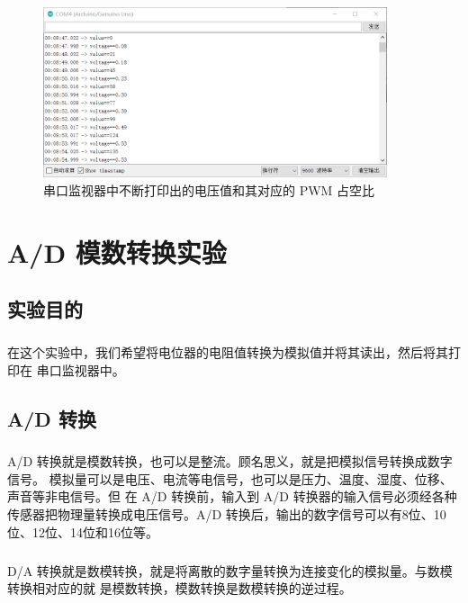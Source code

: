 \documentclass[UTF8, oneside]{ctexbook}
\begin{document}
\begin{figure}[h]
    \centering
    \includegraphics[width=0.9\textwidth]{./result/basic/7/result1.png}
    \caption{串口监视器中不断打印出的电压值和其对应的 PWM 占空比}
    \label{b7_2}
\end{figure}

\chapter{A/D 模数转换实验}

\section{实验目的}
\paragraph{}
在这个实验中，我们希望将电位器的电阻值转换为模拟值并将其读出，然后将其打印在
串口监视器中。

\section{A/D 转换}
\paragraph{}
A/D 转换就是模数转换，也可以是整流。顾名思义，就是把模拟信号转换成数字信号。
模拟量可以是电压、电流等电信号，也可以是压力、温度、湿度、位移、声音等非电信号。但
在 A/D 转换前，输入到 A/D 转换器的输入信号必须经各种传感器把物理量转换成电压信号。A/D 
转换后，输出的数字信号可以有8位、10位、12位、14位和16位等。

\paragraph{}
D/A 转换就是数模转换，就是将离散的数字量转换为连接变化的模拟量。与数模转换相对应的就
是模数转换，模数转换是数模转换的逆过程。
\end{document}

